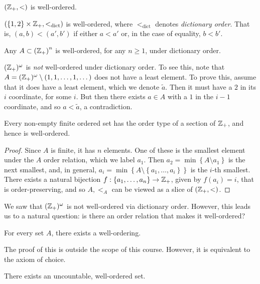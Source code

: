 \begin{example}
	$(\mathbb{Z}_{+}, <)$ is well-ordered.
\end{example}
\begin{example}
	$(\left\{ 1,2 \right\} \times \mathbb{Z}_{+}, <_{\text{dict}})$ is well-ordered,
	where $<_{\text{dict}}$ denotes \emph{dictionary order}. That is,
	$(a,b) < (a', b')$ if either $a < a'$ or, in the case of equality,
	$b < b'$.
\end{example}
\begin{example}
	Any $A \subset \left( \mathbb{Z}_{+} \right)^{n}$ is well-ordered, for any $n \ge 1$, under
	dictionary order. 
\end{example} 
\begin{remark}
	$(\mathbb{Z}_{+})^{\omega}$ is \emph{not} well-ordered under dictionary order. 
	To see this, note that $A = (\mathbb{Z}_{+})^{\omega} \setminus (1, 1, \dots, 1,
	\dots)$ does not have a least element. To prove this, assume that it does
	have a least element, which we denote $\tilde{a}$. 
	Then it must have a $2$ in its $i$ coordinate, for some $i$. 
	But then there exists $a \in A$ with a $1$ in the $i-1$ coordinate, and
	so $a < \tilde{a}$, a contradiction.
\end{remark}
\begin{theorem}
	Every non-empty finite ordered set has the order type of a section of
	$\mathbb{Z}_{+}$, and hence is well-ordered.
\end{theorem}
\begin{proof}
	Since $A$ is finite, it has $n$ elements. One of these is the smallest
	element under the $A$ order relation, which we label $a_{1}$. Then $a_{2} = \min\left\{ A \setminus
	a_{1} \right\}$ is the next smallest, and, in general, $a_{i} = \min \left\{
	A \setminus \left\{ a_{1}, \dots, a_{i} \right\} \right\}$ is the $i$-th
	smallest. There exists a natural bijection $f: \left\{ a_{1}, \dots,
	a_{n} \right\} \to \mathbb{Z}_{+}$, given by $f(a_{i}) = i$, that is
	order-preserving, and so $A, <_{A}$ can be viewed as a slice of $(\mathbb{Z}_{+},
	<)$. 
\end{proof}
We saw that $(\mathbb{Z}_{+})^{\omega}$ is not well-ordered via dictionary order.
However, this leads us to a natural question: is there an order relation that
makes it well-ordered?

\begin{theorem}[Zermelo]
	For every set $A$, there exists a well-ordering.
\end{theorem}
The proof of this is outside the scope of this course. However, it is equivalent
to the axiom of choice.
\begin{corollary}
	There exists an uncountable, well-ordered set.
\end{corollary}
